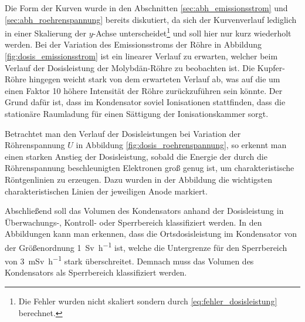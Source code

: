 \documentclass[11pt, a4paper]{article}
\numberwithin{equation}{section}
\begin{document}
Die Form der Kurven wurde in den Abschnitten \ref{sec:abh_emissionsstrom} und \ref{sec:abh_roehrenspannung} bereits diskutiert, da sich der Kurvenverlauf lediglich in einer Skalierung der $y$-Achse unterscheidet\footnote{Die Fehler wurden nicht skaliert sondern durch \eqref{eq:fehler_dosisleistung} berechnet.} und soll hier nur kurz wiederholt werden.
Bei der Variation des Emissionsstroms der Röhre in Abbildung \ref{fig:dosis_emissionsstrom} ist ein linearer Verlauf zu erwarten, welcher beim Verlauf der Dosisleistung der Molybdän-Röhre zu beobachten ist.
Die Kupfer-Röhre hingegen weicht stark von dem erwarteten Verlauf ab, was auf die um einen Faktor 10 höhere Intensität der Röhre zurückzuführen sein könnte.
Der Grund dafür ist, dass im Kondensator soviel Ionisationen stattfinden, dass die stationäre Raumladung für einen Sättigung der Ionisationskammer sorgt.

Betrachtet man den Verlauf der Dosisleistungen bei Variation der Röhrenspannung $U$ in Abbildung \ref{fig:dosis_roehrenspannung}, so erkennt man einen starken Anstieg der Dosisleistung, sobald die Energie der durch die Röhrenspannung beschleunigten Elektronen groß genug ist, um charakteristische Röntgenlinien zu erzeugen.
Dazu wurden in der Abbildung die wichtigsten charakteristischen Linien der jeweiligen Anode markiert.

Abschließend soll das Volumen des Kondensators anhand der Dosisleistung in Überwachungs-, Kontroll- oder Sperrbereich klassifiziert werden.
In den Abbildungen kann man erkennen, dass die Ortsdosisleistung im Kondensator von der Größenordnung \SI{1}{\sievert\per\hour} ist, welche die Untergrenze für den Sperrbereich von \SI{3}{\milli\sievert\per\hour} stark überschreitet.
Demnach muss das Volumen des Kondensators als Sperrbereich klassifiziert werden.
\end{document}
